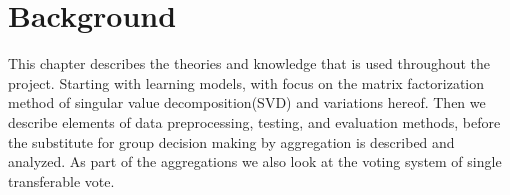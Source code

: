 \chapter{Background}\label{background}

This chapter describes the theories and knowledge that is used throughout the project. Starting with learning models, with focus on the matrix factorization method of singular value decomposition(SVD) and variations hereof. Then we describe elements of data preprocessing, testing, and evaluation methods, before the substitute for group decision making by aggregation is described and analyzed. As part of the aggregations we also look at the voting system of single transferable vote.




